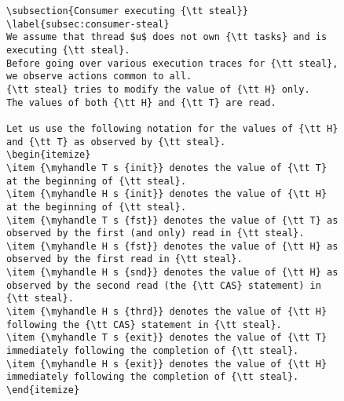 \documentclass[a4paper]{article}
\begin{document}
{\begin{figure}
\begin{lstlisting}
\subsection{Consumer executing {\tt steal}}
\label{subsec:consumer-steal}
We assume that thread $u$ does not own {\tt tasks} and is executing {\tt steal}.
Before going over various execution traces for {\tt steal}, we observe actions common to all.
{\tt steal} tries to modify the value of {\tt H} only. 
The values of both {\tt H} and {\tt T} are read.

Let us use the following notation for the values of {\tt H} and {\tt T} as observed by {\tt steal}.
\begin{itemize}
\item {\myhandle T s {init}} denotes the value of {\tt T} at the beginning of {\tt steal}.
\item {\myhandle H s {init}} denotes the value of {\tt H} at the beginning of {\tt steal}.
\item {\myhandle T s {fst}} denotes the value of {\tt T} as observed by the first (and only) read in {\tt steal}.
\item {\myhandle H s {fst}} denotes the value of {\tt H} as observed by the first read in {\tt steal}.
\item {\myhandle H s {snd}} denotes the value of {\tt H} as observed by the second read (the {\tt CAS} statement) in {\tt steal}.
\item {\myhandle H s {thrd}} denotes the value of {\tt H} following the {\tt CAS} statement in {\tt steal}.
\item {\myhandle T s {exit}} denotes the value of {\tt T} immediately following the completion of {\tt steal}.
\item {\myhandle H s {exit}} denotes the value of {\tt H} immediately following the completion of {\tt steal}.
\end{itemize}


\end{lstlisting}
\end{figure}}
\end{document}
